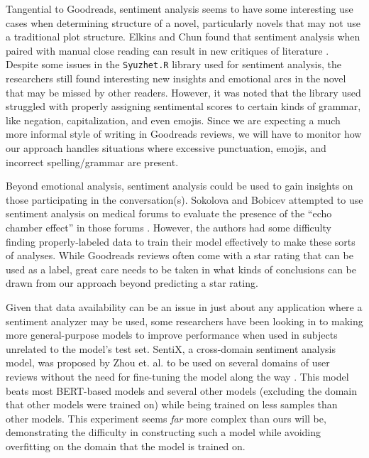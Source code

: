 Tangential to Goodreads, sentiment analysis seems to have some interesting use cases when determining structure of
a novel, particularly novels that may not use a traditional plot structure. Elkins and Chun found that sentiment
analysis when paired with manual close reading can result in new critiques of literature \cite{Elkins2019}. Despite
some issues in the \texttt{Syuzhet.R} library used for sentiment analysis, the researchers still found interesting
new insights and emotional arcs in the novel that may be missed by other readers. However, it was noted that the
library used struggled with properly assigning sentimental scores to certain kinds of grammar, like negation,
capitalization, and even emojis. Since we are expecting a much more informal style of writing in Goodreads
reviews, we will have to monitor how our approach handles situations where excessive punctuation, emojis, and
incorrect spelling/grammar are present.

Beyond emotional analysis, sentiment analysis could be used to gain insights on those participating in the
conversation(s). Sokolova and Bobicev attempted to use sentiment analysis on medical forums to evaluate
the presence of the ``echo chamber effect'' in those forums \cite{Sokolova2020}. However, the authors had some
difficulty finding properly-labeled data to train their model effectively to make these sorts of analyses.
While Goodreads reviews often come with a star rating that can be used as a label, great care needs to be
taken in what kinds of conclusions can be drawn from our approach beyond predicting a star rating.

Given that data availability can be an issue in just about any application where a sentiment analyzer may
be used, some researchers have been looking in to making more general-purpose models to improve performance
when used in subjects unrelated to the model's test set. SentiX, a cross-domain sentiment analysis model, was
proposed by Zhou et. al. to be used on several domains of user reviews without the need for fine-tuning the model
along the way \cite{Zhou2020}. This model beats most BERT-based models and several other models (excluding the domain that other
models were trained on) while being trained on less samples than other models. This experiment seems \textit{far} more
complex than ours will be, demonstrating the difficulty in constructing such a model while avoiding overfitting
on the domain that the model is trained on.

